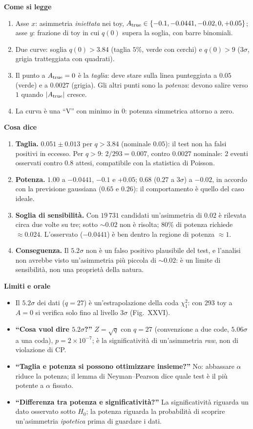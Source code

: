 \documentclass[10.5pt,a4paper]{article}
\newcommand{\sez}[1]{\par\Needspace{6\baselineskip}\medskip\noindent\textbf{\large #1}\par\nopagebreak\smallskip}
\begin{document}
\sez{Come si legge}
\begin{enumerate}
\item Asse $x$: asimmetria \emph{iniettata} nei toy, $A_{\rm true}\in\{-0.1,-0.0441,-0.02,0,+0.05\}$; asse $y$: frazione di toy in cui $q(0)$ supera la soglia, con barre binomiali.
\item Due curve: soglia $q(0)>3.84$ (taglia $5\%$, verde con cerchi) e $q(0)>9$ ($3\sigma$, grigia tratteggiata con quadrati).
\item Il punto a $A_{\rm true}=0$ è la \emph{taglia}: deve stare sulla linea punteggiata a $0.05$ (verde) e a $0.0027$ (grigia). Gli altri punti sono la \emph{potenza}: devono salire verso $1$ quando $|A_{\rm true}|$ cresce.
\item La curva è una ``V'' con minimo in $0$: potenza simmetrica attorno a zero.
\end{enumerate}

\sez{Cosa dice}
\begin{enumerate}
\item \textbf{Taglia.} $0.051\pm0.013$ per $q>3.84$ (nominale $0.05$): il test non ha falsi positivi in eccesso. Per $q>9$: $2/293=0.007$, contro $0.0027$ nominale: $2$ eventi osservati contro $0.8$ attesi, compatibile con la statistica di Poisson.
\item \textbf{Potenza.} $1.00$ a $-0.0441$, $-0.1$ e $+0.05$; $0.68$ ($0.27$ a $3\sigma$) a $-0.02$, in accordo con la previsione gaussiana ($0.65$ e $0.26$): il comportamento è quello del caso ideale.
\item \textbf{Soglia di sensibilità.} Con $19\,731$ candidati un'asimmetria di $0.02$ è rilevata circa due volte su tre; sotto $\sim0.02$ non è risolta; $80\%$ di potenza richiede $\approx0.024$. L'osservato ($-0.0441$) è ben dentro la regione di potenza $\approx1$.
\item \textbf{Conseguenza.} Il $5.2\sigma$ non è un falso positivo plausibile del test, e l'analisi non avrebbe visto un'asimmetria più piccola di $\sim0.02$: è un limite di sensibilità, non una proprietà della natura.
\end{enumerate}

\sez{Limiti e orale}
\begin{itemize}
\item Il $5.2\sigma$ dei dati ($q=27$) è un'estrapolazione della coda $\chi^2_1$: con $293$ toy a $A=0$ si verifica solo fino al livello $3\sigma$ (Fig.~XXVI).
\item \textbf{``Cosa vuol dire $5.2\sigma$?''} $Z=\sqrt{q}$ con $q=27$ (convenzione a due code, $5.06\sigma$ a una coda), $p=2\times10^{-7}$; è la significatività di un'asimmetria \emph{raw}, non di violazione di CP.
\item \textbf{``Taglia e potenza si possono ottimizzare insieme?''} No: abbassare $\alpha$ riduce la potenza; il lemma di Neyman--Pearson dice quale test è il più potente a $\alpha$ fissato.
\item \textbf{``Differenza tra potenza e significatività?''} La significatività riguarda un dato osservato sotto $H_0$; la potenza riguarda la probabilità di scoprire un'asimmetria \emph{ipotetica} prima di guardare i dati.
\end{itemize}
\end{document}
